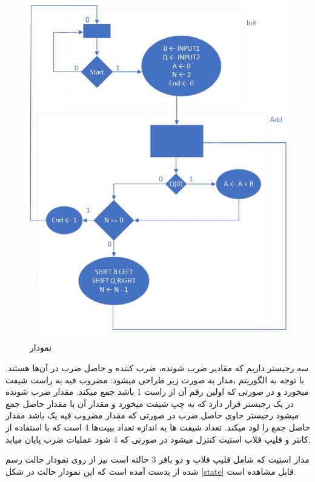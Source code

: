 \documentclass[fleqn]{article}
\begin{document}
\begin{figure}[!htbp]
    \includegraphics[width=\textwidth]{Assets/asm.jpg}
    \caption{نمودار }
    \label{asm}
\end{figure}

سه رجیستر داریم که مقادیر ضرب شونده، ضرب کننده و حاصل ضرب در آن‌ها هستند. 
با توجه به الگوریتم 
،مدار به صورت زیر طراحی میشود:
مضروب فیه به راست شیفت میخورد و در صورتی که اولین رقم آن از راست 1 باشد جمع میکند.
مقدار ضرب شونده در یک رجیستر قرار دارد که به چپ شیفت میخورد و مقدار آن با مقدار حاصل جمع میشود
رجیستر حاوی حاصل ضرب در صورتی که مقدار مضروب فیه یک باشد مقدار حاصل جمع را لود میکند.
تعداد شیفت ها به اندازه تعداد بییت‌ها 4 است که 
با استفاده از کانتر و فلیپ فلاپ استیت کنترل میشود در صورتی که 4 شود عملیات ضرب پایان میابد.

مدار استیت که شامل فلیپ فلاپ و دو بافر 3 حالته است نیز از روی نمودار حالت رسم شده از 
بدست آمده است که این نمودار حالت در شکل 
\ref{state}
قابل مشاهده است. 
\end{document}
